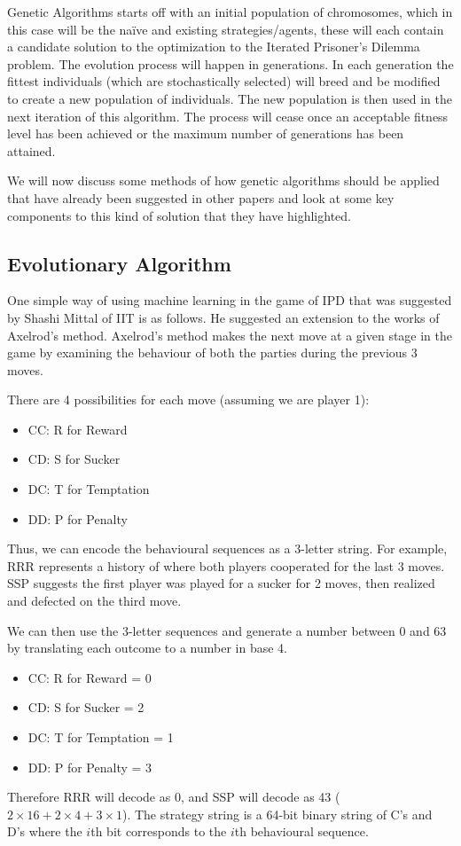 \documentclass{icldt}
\numberwithin{equation}{section}       %
\begin{document}
Genetic Algorithms starts off with an initial population of chromosomes, which in this case will be the naïve and existing strategies/agents, these will each contain a candidate solution to the optimization to the Iterated Prisoner's Dilemma problem. The evolution process will happen in generations. In each generation the fittest individuals (which are stochastically selected) will breed and be modified to create a new population of individuals. The new population is then used in the next iteration of this algorithm. The process will cease once an acceptable fitness level has been achieved or the maximum number of generations has been attained. 

We will now discuss some methods of how genetic algorithms should be applied that have already been suggested in other papers and look at some key components to this kind of solution that they have highlighted.

\subsection{Evolutionary Algorithm}
\label{sect:Evolutionary Algorithm}
One simple way of using machine learning in the game of IPD that was suggested by Shashi Mittal of IIT is as follows. He suggested an extension to the works of Axelrod's method. Axelrod's method makes the next move at a given stage in the game by examining the behaviour of both the parties during the previous 3 moves. \cite{axelrod1987}

There are 4 possibilities for each move (assuming we are player 1):
\begin{itemize}
\item CC: R for Reward
\item CD: S for Sucker
\item DC: T for Temptation
\item DD: P for Penalty
\end{itemize}

Thus, we can encode the behavioural sequences as a 3-letter string. For example, RRR represents a history of where both players cooperated for the last 3 moves. SSP suggests the first player was played for a sucker for 2 moves, then realized and defected on the third move.

We can then use the 3-letter sequences and generate a number between 0 and 63 by translating each outcome to a number in base 4.
\begin{itemize}
\item CC: R for Reward = 0
\item CD: S for Sucker = 2
\item DC: T for Temptation = 1
\item DD: P for Penalty = 3
\end{itemize}
Therefore RRR will decode as 0, and SSP will decode as 43 (\(2\times 16 + 2\times 4 + 3\times 1\)).
The strategy string is a 64-bit binary string of C's and D's where the $i $th bit corresponds to the $i $th behavioural sequence.
\end{document}
